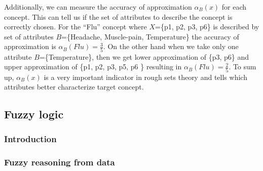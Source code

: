 Additionally, we can measure the accuracy of approximation $\alpha_B(x)$ for each concept.
This can tell us if the set of attributes to describe the concept is correctly
chosen. For the ``Flu'' concept where $X$=\{p1, p2, p3, p6\} is described by
set of attributes $B$=\{Headache, Muscle-pain, Temperature\} the accuracy of
approximation is $\alpha_B(Flu) = \frac{3}{5}$. On the other hand when we take
only one attribute $B$=\{Temperature\}, then we get lower approximation of \{p3,
p6\} and upper approximation of \{p1, p2, p3, p5, p6 \} resulting in
$\alpha_B(Flu) = \frac{2}{5}$. To sum up, $\alpha_B(x)$ is a very important indicator in
rough sets theory and tells which attributes better characterize target
concept. 


\subsection{Fuzzy logic}
\label{cha:Fuzzy_logic}
\subsubsection{Introduction}
\subsubsection{Fuzzy reasoning from data}
